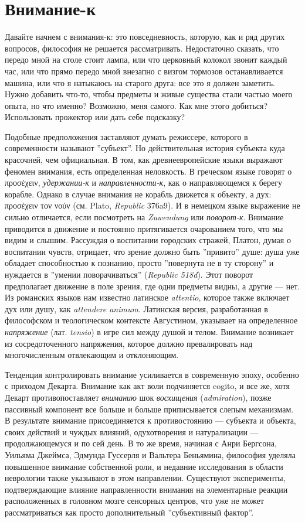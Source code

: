 \documentclass[12pt]{book}
\begin{document}
\section{Внимание-к}

Давайте начнем с внимания-к: это повседневность, которую, как и ряд других вопросов, философия не решается рассматривать. Недостаточно сказать, что передо мной на столе стоит лампа, или что церковный колокол звонит каждый час, или что прямо передо мной внезапно с визгом тормозов останавливается машина, или что я натыкаюсь на старого друга: все это я должен заметить. Нужно добавить что-то, чтобы предметы и живые существа стали частью моего опыта, но что именно? Возможно, меня самого. Как мне этого добиться? Использовать прожектор или дать себе подсказку?

Подобные предположения заставляют думать режиссере, которого в современности называют ''субъект''. Но действительная история субъекта куда красочней, чем официальная. В том, как древнеевропейские языки выражают феномен внимания, есть определенная неловкость. В греческом языке говорят о προσέχειν, \textit{удержании-к} и \textit{направленности-к}, как о направляющемся к берегу корабле. Однако в случае внимания не корабль движется к объекту, а дух: προσέχειν τον νούν (см. Plato, \textit{Republic} 376a9). И в немецком языке выражение не сильно отличается, если посмотреть на \textit{Zuwendung} или \textit{поворот-к}. Внимание приводится в движение и постоянно притягивается очарованием того, что мы видим и слышим. Рассуждая о воспитании городских стражей, Платон, думая о воспитании чувств, отрицает, что зрение должно быть ''привито'' душе: душа уже обладает способностью к познанию, просто ''повернута не в ту сторону'' и нуждается в ''умении поворачиваться'' (\textit{Republic 518d}). Этот поворот предполагает движение в поле зрения, где одни предметы видны, а другие --- нет. Из романских языков нам известно латинское \textit{attentio}, которое также включает дух или душу, как \textit{attendere animum}. Латинская версия, разработанная в философском и теологическом контексте Августином, указывает на определенное \textit{напряжение} (лат. \textit{tensio}) в игре сил между душой и телом. Внимание возникает из сосредоточенного напряжения, которое должно превалировать над многочисленным отвлекающим и отклоняющим.

Тенденция контролировать внимание усиливается в современную эпоху, особенно с приходом Декарта. Внимание как акт воли подчиняется cogito, и все же, хотя Декарт противопоставляет \textit{вниманию} шок \textit{восхищения} (\textit{admiration}), позже пассивный компонент все больше и больше приписывается слепым механизмам. В результате внимание присоединяется к противостоянию --- субъекта и объекта, своих действий и чуждых влияний, одухотворения и натурализации --- продолжающемуся и по сей день. В то же время, начиная с Анри Бергсона, Уильяма Джеймса, Эдмунда Гуссерля и Вальтера Беньямина, философия уделяла повышенное внимание собственной роли, и недавние исследования в области неврологии также указывают в этом направлении. Существуют эксперименты, подтверждающие влияние направленности внимания на элементарные реакции расположенных в головном мозге сенсорных центров, что уже не может рассматриваться как просто дополнительный ''субъективный фактор''.
\end{document}
